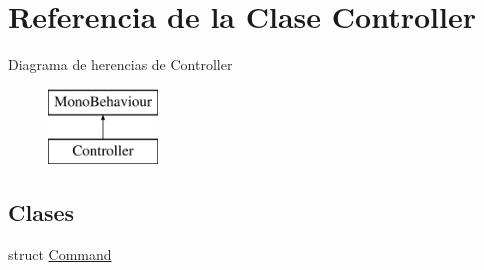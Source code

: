 \hypertarget{class_controller}{}\section{Referencia de la Clase Controller}
\label{class_controller}
Diagrama de herencias de Controller\begin{figure}[H]
\begin{center}
\leavevmode
\includegraphics[height=2.000000cm]{class_controller}
\end{center}
\end{figure}
\subsection*{Clases}
\begin{DoxyCompactItemize}
\item 
struct \mbox{\hyperlink{struct_controller_1_1_command}{Command}}
\end{DoxyCompactItemize}
